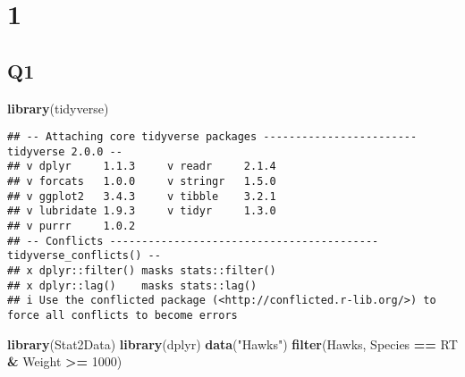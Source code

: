 \documentclass[
]{article}
\author{}
\date{\vspace{-2.5em}}
\newenvironment{Shaded}{\begin{snugshade}}{\end{snugshade}}
\newcommand{\DecValTok}[1]{\textcolor[rgb]{0.00,0.00,0.81}{#1}}
\newcommand{\FunctionTok}[1]{\textcolor[rgb]{0.13,0.29,0.53}{\textbf{#1}}}
\newcommand{\NormalTok}[1]{#1}
\newcommand{\SpecialCharTok}[1]{\textcolor[rgb]{0.81,0.36,0.00}{\textbf{#1}}}
\newcommand{\StringTok}[1]{\textcolor[rgb]{0.31,0.60,0.02}{#1}}
\begin{document}
\hypertarget{section}{%
\section{1}\label{section}}

\hypertarget{q1}{%
\subsection{Q1}\label{q1}}

\begin{Shaded}
\begin{Highlighting}[]
\FunctionTok{library}\NormalTok{(tidyverse)}
\end{Highlighting}
\end{Shaded}

\begin{verbatim}
## -- Attaching core tidyverse packages ------------------------ tidyverse 2.0.0 --
## v dplyr     1.1.3     v readr     2.1.4
## v forcats   1.0.0     v stringr   1.5.0
## v ggplot2   3.4.3     v tibble    3.2.1
## v lubridate 1.9.3     v tidyr     1.3.0
## v purrr     1.0.2     
## -- Conflicts ------------------------------------------ tidyverse_conflicts() --
## x dplyr::filter() masks stats::filter()
## x dplyr::lag()    masks stats::lag()
## i Use the conflicted package (<http://conflicted.r-lib.org/>) to force all conflicts to become errors
\end{verbatim}

\begin{Shaded}
\begin{Highlighting}[]
\FunctionTok{library}\NormalTok{(Stat2Data)}
\FunctionTok{library}\NormalTok{(dplyr)}
\FunctionTok{data}\NormalTok{(}\StringTok{"Hawks"}\NormalTok{)}
\FunctionTok{filter}\NormalTok{(Hawks, Species }\SpecialCharTok{==} \StringTok{\textquotesingle{}RT\textquotesingle{}} \SpecialCharTok{\&}\NormalTok{ Weight }\SpecialCharTok{\textgreater{}=} \DecValTok{1000}\NormalTok{)}
\end{Highlighting}
\end{Shaded}
\end{document}
